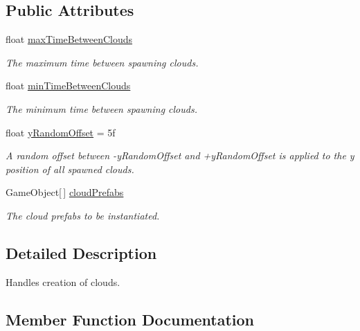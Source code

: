 \subsection*{Public Attributes}
\begin{DoxyCompactItemize}
\item 
float \hyperlink{class_multi_stack_1_1_cloud_controller_aaa4be94bf648790a61668b77ab5563fd}{max\+Time\+Between\+Clouds}
\begin{DoxyCompactList}\small\item\em The maximum time between spawning clouds. \end{DoxyCompactList}\item 
float \hyperlink{class_multi_stack_1_1_cloud_controller_ab1e3aada1f33156adbdbc3fee236d469}{min\+Time\+Between\+Clouds}
\begin{DoxyCompactList}\small\item\em The minimum time between spawning clouds. \end{DoxyCompactList}\item 
float \hyperlink{class_multi_stack_1_1_cloud_controller_a4315b10736e5440d071a4ffdc67e27fe}{y\+Random\+Offset} = 5f
\begin{DoxyCompactList}\small\item\em A random offset between -\/y\+Random\+Offset and +y\+Random\+Offset is applied to the y position of all spawned clouds. \end{DoxyCompactList}\item 
Game\+Object\mbox{[}$\,$\mbox{]} \hyperlink{class_multi_stack_1_1_cloud_controller_a690f660e3c2720d0bd06174842607783}{cloud\+Prefabs}
\begin{DoxyCompactList}\small\item\em The cloud prefabs to be instantiated. \end{DoxyCompactList}\end{DoxyCompactItemize}


\subsection{Detailed Description}
Handles creation of clouds. 



\subsection{Member Function Documentation}
\hypertarget{class_multi_stack_1_1_cloud_controller_a10db53c6e52758567af0bcaf8394b43d}{}
